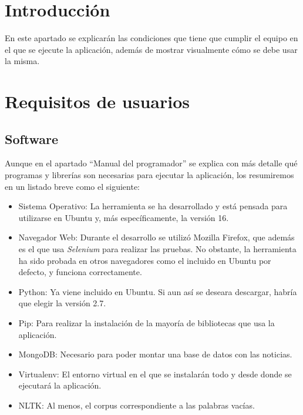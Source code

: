 
\section{Introducción}
En este apartado se explicarán las condiciones que tiene que cumplir el equipo en el que se ejecute la aplicación, además de mostrar visualmente cómo se debe usar la misma.

\section{Requisitos de usuarios}

\subsection{Software}

Aunque en el apartado ``Manual del programador'' se explica con más detalle qué programas y librerías son necesarias para ejecutar la aplicación, los resumiremos en un listado breve como el siguiente:

\begin{itemize}

\item Sistema Operativo: La herramienta se ha desarrollado y está pensada para utilizarse en Ubuntu y, más específicamente, la versión 16.

\item Navegador Web: Durante el desarrollo se utilizó Mozilla Firefox, que además es el que usa \emph{Selenium} para realizar las pruebas. No obstante, la herramienta ha sido probada en otros navegadores como el incluido en Ubuntu por defecto, y funciona correctamente.

\item Python: Ya viene incluido en Ubuntu. Si aun así se deseara descargar, habría que elegir la versión 2.7.

\item Pip: Para realizar la instalación de la mayoría de bibliotecas que usa la aplicación.

\item MongoDB: Necesario para poder montar una base de datos con las noticias.

\item Virtualenv: El entorno virtual en el que se instalarán todo y desde donde se ejecutará la aplicación.

\item NLTK: Al menos, el corpus correspondiente a las palabras vacías.
\end{itemize}

